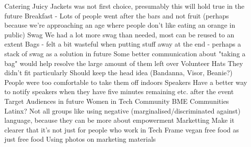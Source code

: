 \documentclass[11pt]{meetingmins}
\begin{document}
\begin{items}
		\subitem Catering
			\subsubitem Juicy Jackets was not first choice, presumably this will hold true in the future
			\subsubitem Breakfast - Lots of people went after the bars and not fruit (perhaps because we're approaching an age where people don't like eating an orange in public)
		\subitem Swag
			\subsubitem We had a lot more swag than needed, most can be reused to an extent
			\subsubitem Bags - felt a bit wasteful when putting stuff away at the end - perhaps a stack of swag as a solution in future
			\subsubitem Some better communication about "taking a bag" would help resolve the large amount of them left over
		\subitem Volunteer Hats
			\subsubitem They didn't fit particularly 
			\subsubitem Should keep the head idea (Bandanna, Visor, Beanie?)
			\subsubitem People were too comfortable to take them off indoors
		\subitem Speakers
			\subsubitem Have a better way to notify speakers when they have five minutes remaining etc. after the event
		\subitem Target Audiences in future
			\subsubitem Women in Tech Community
			\subsubitem BME Communities
			\subsubitem Latinx?
			\subsubitem Not all groups like using negative (marginalised/discriminated against) language, because they can be more about empowerment
		\subitem Marketting
			\subsubitem Make it clearer that it's not just for people who work in Tech
			\subsubitem Frame vegan free food as just free food
			\subsubitem Using photos on marketing materials
\end{items}
\end{document}
